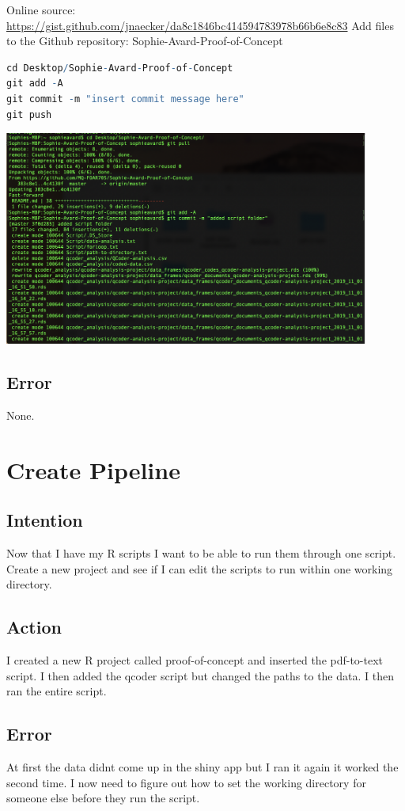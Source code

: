 \documentclass{article}
\begin{document}
Online source: \href{https://gist.github.com/jnaecker/da8c1846bc414594783978b66b6e8c83}{https://gist.github.com/jnaecker/da8c1846bc414594783978b66b6e8c83}
Add files to the Github repository: Sophie-Avard-Proof-of-Concept
\begin{lstlisting}[language=R]
cd Desktop/Sophie-Avard-Proof-of-Concept
git add -A
git commit -m "insert commit message here"
git push 
\end{lstlisting}

\includegraphics[width=12cm]{git-commit.png}

\subsection{Error}
None.

\section{Create Pipeline}
\subsection{Intention}
Now that I have my R scripts I want to be able to run them through one script. Create a new project and see if I can edit the scripts to run within one working directory. 

\subsection{Action}
I created a new R project called proof-of-concept and inserted the pdf-to-text script. I then added the qcoder script but changed the paths to the data. I then ran the entire script.

\subsection{Error}
At first the data didnt come up in the shiny app but I ran it again it worked the second time. I now need to figure out how to set the working directory for someone else before they run the script. 
\end{document}
